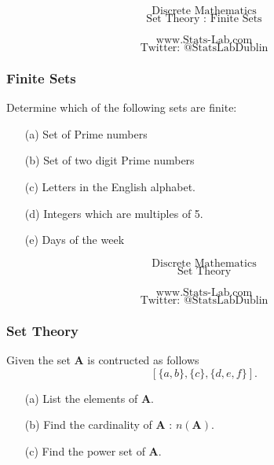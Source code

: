 \documentclass{beamer}
\begin{document}
\begin{frame}
\Huge
\[\mbox{Discrete Mathematics}\]
\Huge
\[\mbox{Set Theory : Finite Sets}\]

\Large
\[\mbox{www.Stats-Lab.com}\]
\Large
\[\mbox{Twitter: @StatsLabDublin}\]

\end{frame}
\begin{frame}
\frametitle{Finite Sets}
\Large
\vspace{-1.2cm}
Determine which of the following sets are finite:
\begin{itemize}
\item[(a)] Set of Prime numbers %
\vspace{0.4cm}
\item[(b)] Set of two digit Prime numbers %
\vspace{0.4cm}
\item[(c)] Letters in the English alphabet.
\vspace{0.4cm}
\item[(d)] Integers which are multiples of 5.
\vspace{0.4cm}
\item[(e)] Days of the week %
\end{itemize}
\end{frame}





\begin{frame}
\Huge
\[\mbox{Discrete Mathematics}\]
\Huge
\[\mbox{Set Theory}\]

\Large
\[\mbox{www.Stats-Lab.com}\]
\Large
\[\mbox{Twitter: @StatsLabDublin}\]

\end{frame}

\begin{frame}
\frametitle{Set Theory}
\Large
\vspace{-1.8cm}
Given the set \textbf{A} is contructed as follows 
\[ [\{a, b\}, \{c\}, \{d, e, f \} ]. \]

\begin{itemize}
\item[(a)] List the elements of \textbf{A}. 
\item[(b)] Find the cardinality of \textbf{A} : $n(\boldsymbol{A})$. 
\item[(c)] Find the power set of \textbf{A}.
\end{itemize}

\end{frame}
\end{document}
